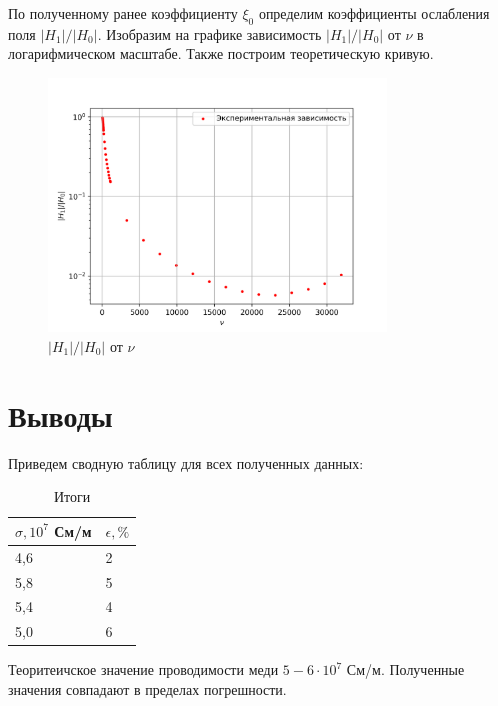 \documentclass[a4paper, 12pt]{article}
\begin{document}
По полученному ранее коэффициенту $\xi_0$ определим коэффициенты ослабления поля $ |H_1|/|H_0|$. 
Изобразим на графике зависимость $ |H_1|/|H_0|$ от  $\nu$ в логарифмическом масштабе. Также построим теоретическую кривую.
\begin{figure}[H]
    \centering
    \includegraphics[width=0.8\textwidth]{Hlnnu.png}
    \caption{$|H_1|/|H_0|$ от  $\nu$}
    \label{fig:gln}
\end{figure}

\section{Выводы}
Приведем сводную таблицу для всех полученных данных:
\begin{table}[H]
	\centering
	\begin{tabular}{|l|l|}
	\hline
	$\sigma, 10^7$ См/м & $\epsilon, \%$ \\ \hline
	4,6           & 2              \\ \hline
	5,8                 & 5              \\ \hline
	5,4                 & 4              \\ \hline
	5,0                 & 6              \\ \hline
	\end{tabular}
	\caption{Итоги}
	\label{tab:itogi}
\end{table}
Теоритеичское значение проводимости меди $5-6 \cdot 10^7$ См/м. Полученные значения совпадают в пределах погрешности.
\end{document}
